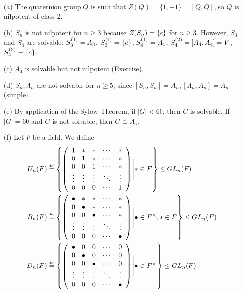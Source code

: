 \documentclass[11pt]{book}
\theoremstyle{definition}   \newtheorem{defn}[counter]{Definition} %
\newcommand\myeq{\mathrel{\overset{\makebox[0pt]{\mbox{\normalfont\tiny\sffamily \textrm{def}}}}{=}}}
\newcommand{\mymatrix}[2]{\left( \begin{array}{#1} #2 \end{array} \right)}   \newcommand{\myvec}[1]{\left( \begin{array}{c} #1 \end{array} \right)}
\numberwithin{counter}{chapter}
\begin{document}
\begin{example}
\
\begin{enumerate}
\item[(a)] The quaternion group $Q$ is such that $Z(Q) = \{1,-1\} = [Q,Q]$, so $Q$ is nilpotent of class 2.
\item[(b)] $S_n$ is not nilpotent for $n \geq 3$ because $Z(S_n) = \{e\}$ for $n \geq 3$. However, $S_3$ and $S_4$ are solvable: $S_3^{(1)} = A_3$, $S_3^{(2)} = \{e\}$, $S_4^{(1)} = A_4$, $S_4^{(2)} = [A_4,A_4] = V$, $S_4^{(3)} = \{e\}$.
\item[(c)] $A_4$ is solvable but not nilpotent (Exercise).
\item[(d)] $S_n, A_n$ are not solvable for $n \geq 5$, since $[S_n,S_n] = A_n, [A_n,A_n] = A_n$ (simple).
\item[(e)] By application of the Sylow Theorem, if $|G| < 60$, then $G$ is solvable. If $|G| = 60$ and $G$ is not solvable, then $G \cong A_5$.
\item[(f)] Let $F$ be a field. We define
	\begin{align*}
	U_n(F) &\myeq \left\{ \mymatrix{ccccc}{1 & * & * & \cdots & * \\
										 0 & 1 & * & \cdots & * \\
										 0 & 0 & 1 & \cdots & * \\
										 \vdots & \vdots & \vdots & \ddots & \vdots \\
										 0 & 0 & 0 & \cdots & 1}  \Bigg| * \in F \right\} \leq GL_n(F) \\
	B_n(F) &\myeq \left\{ \mymatrix{ccccc}{\bullet & * & * & \cdots & * \\
										   0 & \bullet & * & \cdots & * \\
										   0 & 0 & \bullet & \cdots & * \\
									   	   \vdots & \vdots & \vdots & \ddots & \vdots \\
										   0 & 0 & 0 & \cdots & \bullet}  \Bigg| \bullet \in F\x, * \in F \right\} \leq GL_n(F) \\
	D_n(F) &\myeq \left\{ \mymatrix{ccccc}{\bullet & 0 & 0 & \cdots & 0 \\
											   0 & \bullet & 0 & \cdots & 0 \\
											   0 & 0 & \bullet & \cdots & 0 \\
										   	   \vdots & \vdots & \vdots & \ddots & \vdots \\
											   0 & 0 & 0 & \cdots & \bullet}  \Bigg| \bullet \in F\x \right\} \leq GL_n(F)
	\end{align*}
\end{enumerate}
\end{example}
\end{document}
